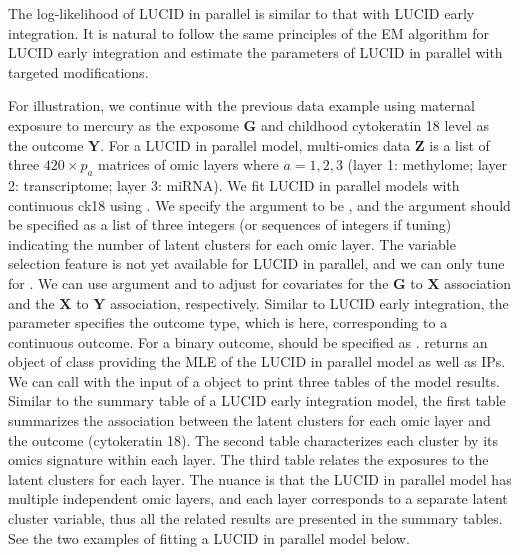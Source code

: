 The log-likelihood of LUCID in parallel is similar to that with LUCID early integration. It is natural to follow the same principles of the EM algorithm for LUCID early integration and estimate the parameters of LUCID in parallel with targeted modifications.

For illustration, we continue with the previous data example using maternal exposure to mercury as the exposome $\bm G$ and childhood cytokeratin 18 level as the outcome $\bm Y$. For a LUCID in parallel model, multi-omics data $\bm Z$ is a list of three $420 \times p_a$ matrices of omic layers where $a = 1, 2, 3$ (layer 1: methylome; layer 2: transcriptome; layer 3: miRNA). We fit LUCID in parallel models with continuous ck18 using . We specify the argument  to be , and the argument  should be specified as a list of three integers (or sequences of integers if tuning) indicating the number of latent clusters for each omic layer. The variable selection feature is not yet available for LUCID in parallel, and we can only tune for . We can use argument  and  to adjust for covariates for the $\bm G$ to $\bm X$ association and the $\bm X$ to $\bm Y$ association, respectively. Similar to LUCID early integration, the parameter  specifies the outcome type, which is  here, corresponding to a continuous outcome. For a binary outcome,  should be specified as .  returns an object of class  providing the MLE of the LUCID in parallel model as well as IPs. We can call  with the input of a  object to print three tables of the model results. Similar to the summary table of a LUCID early integration model, the first table summarizes the association between the latent clusters for each omic layer and the outcome (cytokeratin 18). The second table characterizes each cluster by its omics signature within each layer. The third table relates the exposures to the latent clusters for each layer. The nuance is that the LUCID in parallel model has multiple independent omic layers, and each layer corresponds to a separate latent cluster variable, thus all the related results are presented in the summary tables. See the two examples of fitting a LUCID in parallel model below.

